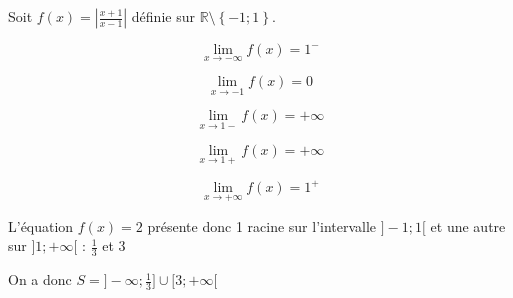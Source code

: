 \documentclass{report}
\begin{document}
Soit $f(x) = \left| \frac{x+1}{x-1} \right|$ définie sur $\mathbb{R} \setminus \left\lbrace -1 ; 1 \right\rbrace$.

\begin{displaymath}
	\lim_{x \rightarrow -\infty} f(x) = 1^{-}
\end{displaymath}

\begin{displaymath}
	\lim_{x \rightarrow -1} f(x) = 0
\end{displaymath}

\begin{displaymath}
	\lim_{x \rightarrow 1-} f(x) = +\infty
\end{displaymath}

\begin{displaymath}
	\lim_{x \rightarrow 1+} f(x) = +\infty
\end{displaymath}

\begin{displaymath}
	\lim_{x \rightarrow +\infty} f(x) = 1^{+}
\end{displaymath}


L'équation $f(x)=2$ présente donc 1 racine sur l'intervalle $]-1 ; 1[$ et une autre sur $]1; +\infty[$ : $\frac{1}{3}$ et $3$

On a donc $S = ]-\infty ; \frac{1}{3}] \cup [3 ; +\infty[$
\end{document}
